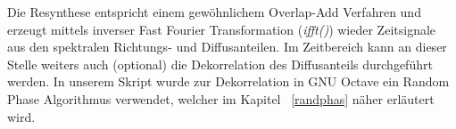 Die Resynthese entspricht einem gewöhnlichem Overlap-Add Verfahren und erzeugt mittels inverser Fast Fourier Transformation (\textit{ifft()}) wieder Zeitsignale aus den spektralen Richtungs- und Diffusanteilen. Im Zeitbereich kann an dieser Stelle weiters auch (optional) die Dekorrelation des Diffusanteils durchgeführt werden. In unserem Skript wurde zur Dekorrelation in GNU Octave ein Random Phase Algorithmus verwendet, welcher im Kapitel ~\ref{randphas} näher erläutert wird.